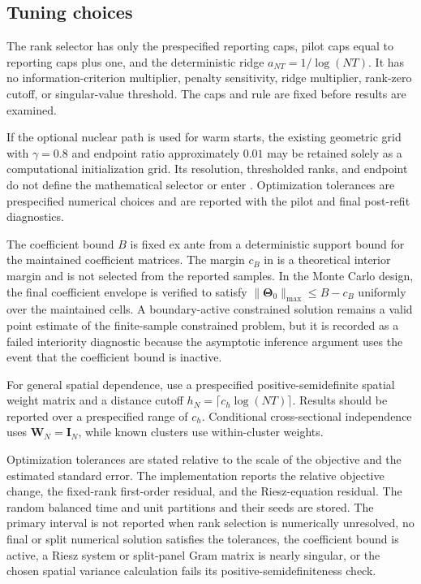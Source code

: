 \documentclass[11pt]{article}
\numberwithin{equation}{section}
\theoremstyle{remark}
\newcommand{\bTheta}{\bm\Theta}
\begin{document}
\subsection{Tuning choices}
\label{subsec:tuning}

The rank selector has only the prespecified reporting caps, pilot caps equal to reporting caps plus one, and the deterministic ridge $a_{NT}=1/\log(NT)$. It has no information-criterion multiplier, penalty sensitivity, ridge multiplier, rank-zero cutoff, or singular-value threshold. The caps and rule are fixed before results are examined.

If the optional nuclear path is used for warm starts, the existing geometric grid with $\gamma=0.8$ and endpoint ratio approximately $0.01$ may be retained solely as a computational initialization grid. Its resolution, thresholded ranks, and endpoint do not define the mathematical selector or enter . Optimization tolerances are prespecified numerical choices and are reported with the pilot and final post-refit diagnostics.

The coefficient bound $B$ is fixed ex ante from a deterministic support bound for the maintained coefficient matrices. The margin $c_B$ in  is a theoretical interior margin and is not selected from the reported samples. In the Monte Carlo design, the final coefficient envelope is verified to satisfy $\|\bTheta_0\|_{\max}\le B-c_B$ uniformly over the maintained cells. A boundary-active constrained solution remains a valid point estimate of the finite-sample constrained problem, but it is recorded as a failed interiority diagnostic because the asymptotic inference argument uses the event that the coefficient bound is inactive.

For general spatial dependence, use a prespecified positive-semidefinite spatial weight matrix and a distance cutoff $h_N=\lceil c_h\log(NT)\rceil$. Results should be reported over a prespecified range of $c_h$. Conditional cross-sectional independence uses $\bm W_N=\bm I_N$, while known clusters use within-cluster weights.

Optimization tolerances are stated relative to the scale of the objective and the estimated standard error. The implementation reports the relative objective change, the fixed-rank first-order residual, and the Riesz-equation residual. The random balanced time and unit partitions and their seeds are stored. The primary interval is not reported when rank selection is numerically unresolved, no final or split numerical solution satisfies the tolerances, the coefficient bound is active, a Riesz system or split-panel Gram matrix is nearly singular, or the chosen spatial variance calculation fails its positive-semidefiniteness check.
\end{document}

